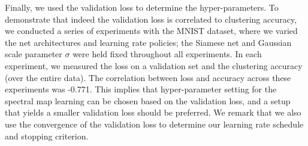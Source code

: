 \documentclass{article} %
\begin{document}
Finally, we used the validation loss to determine the hyper-parameters. To demonstrate that indeed the validation loss is correlated to clustering accuracy, we conducted a series of experiments with the MNIST dataset, where we varied the net architectures and learning rate policies; the Siamese net and Gaussian scale parameter $\sigma$ were held fixed throughout all experiments. In each experiment, we measured the loss on a validation set and the clustering accuracy (over the entire data). The correlation between loss and accuracy across these experiments was -0.771. This implies that hyper-parameter setting for the spectral map learning can be chosen based on the validation loss, and a setup that yields a smaller validation loss should be preferred. We remark that we also use the convergence of the validation loss to determine our learning rate schedule and stopping criterion.

\end{document}
